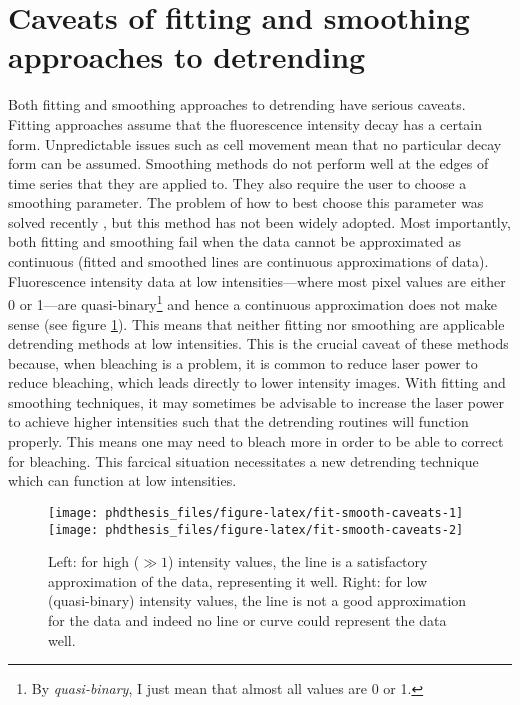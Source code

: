\documentclass[12pt,]{book}
\let\rmarkdownfootnote\footnote%
\def\footnote{\protect\rmarkdownfootnote}
\theoremstyle{definition}
\theoremstyle{definition}
\theoremstyle{definition}
\theoremstyle{remark}
\begin{document}
\section{Caveats of fitting and smoothing approaches to
detrending}\label{caveats-of-fitting-and-smoothing-approaches-to-detrending}

Both fitting and smoothing approaches to detrending have serious
caveats. Fitting approaches assume that the fluorescence intensity decay
has a certain form. Unpredictable issues such as cell movement mean that
no particular decay form can be assumed. Smoothing methods do not
perform well at the edges of time series that they are applied to. They
also require the user to choose a smoothing parameter. The problem of
how to best choose this parameter was solved recently \citep{nandb}, but
this method has not been widely adopted. Most importantly, both fitting
and smoothing fail when the data cannot be approximated as continuous
(fitted and smoothed lines are continuous approximations of data).
Fluorescence intensity data at low intensities---where most pixel values
are either 0 or 1---are quasi-binary\footnote{By \emph{quasi-binary}, I
  just mean that almost all values are 0 or 1.} and hence a continuous
approximation does not make sense (see figure
\ref{fig:fit-smooth-caveats}). This means that neither fitting nor
smoothing are applicable detrending methods at low intensities. This is
the crucial caveat of these methods because, when bleaching is a
problem, it is common to reduce laser power to reduce bleaching, which
leads directly to lower intensity images. With fitting and smoothing
techniques, it may sometimes be advisable to increase the laser power to
achieve higher intensities such that the detrending routines will
function properly. This means one may need to bleach more in order to be
able to correct for bleaching. This farcical situation necessitates a
new detrending technique which can function at low intensities.







\begin{figure}

\texttt{[image: phdthesis\_files/figure-latex/fit-smooth-caveats-1]} \texttt{[image: phdthesis\_files/figure-latex/fit-smooth-caveats-2]} \hfill{}

\caption{Left: for high (\(\gg 1\)) intensity
values, the line is a satisfactory approximation of the data,
representing it well. Right: for low (quasi-binary) intensity values,
the line is not a good approximation for the data and indeed no line or
curve could represent the data well.}\label{fig:fit-smooth-caveats}
\end{figure}
\end{document}
